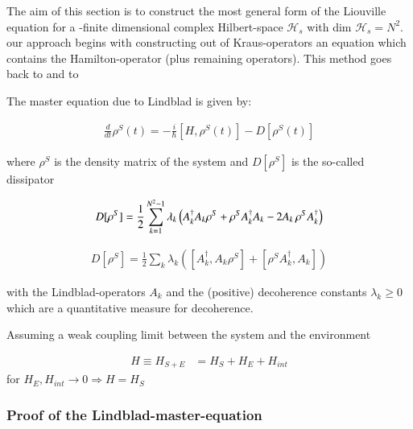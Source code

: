 The aim of this section is to  construct the most general form of the Liouville equation for a -finite dimensional complex Hilbert-space $\mathcal{H}_{s} $ with dim $\mathcal{H}_{s} = N^{2}$. our approach begins with constructing out of Kraus-operators an equation which contains the Hamilton-operator (plus remaining operators).
This method goes back to \cite{lindblad1976}  and to \cite{gorini1976completely} 




The master equation due to Lindblad is given by:

\begin{align}\label{aft33:99}
\frac { d }{ dt } { \rho  }^{ S }(t)=-\frac { i }{ \hslash  } \left[ H,{ \rho  }^{ S }(t) \right] -D\left[ { \rho  }^{ S }(t) \right] 
\end{align}

where ${\rho  }^{ S }$ is the density matrix of the system and $D\left[ { \rho  }^{ S } \right]$ is the so-called dissipator

\begin{align}\label{aft33:100}
D[{ \rho  }^{ S }]=\frac {1}{2}\sum_{k=1}^{ {N}^{2}-1}{{\lambda}_{k}}\left({A}_{k}^{ \dagger}{ A }_{ k }{ \rho  }^{ S }+{ \rho  }^{ S }{ A }_{ k }^{ \dagger  }{ A }_{ k }-2{ A }_{ k }\thinspace{ \rho  }^{ S }{ A }_{ k }^{ \dagger  } \right) 
\end{align}

\begin{align}\label{aft33:101}
D[{ \rho  }^{ S }]=\frac { 1 }{ 2 } \sum _{ k}{ { \lambda  }_{ k } } \left(\left[ { A }_{ k }^{ \dagger  },{ A }_{ k }{ \rho  }^{ S }\right]+\left[{ \rho  }^{ S }{ A }_{ k }^{ \dagger  },{ A }_{ k }\right] \right) 
\end{align}

with the Lindblad-operators $A_{k}$ and the (positive) decoherence constants ${\lambda}_{k} \geq {0}$ which
are a quantitative measure for decoherence.

Assuming a weak coupling limit between the system and the environment

\begin{align}\label{aft33:102}
H\equiv H_{S+E}&=H_{S} + H_{E}+H_{int}
\end{align}
for $ H_{E}, H_{int}\rightarrow 0 \Rightarrow H= H_{S}$\\

\subsubsection{Proof of the Lindblad-master-equation} 


